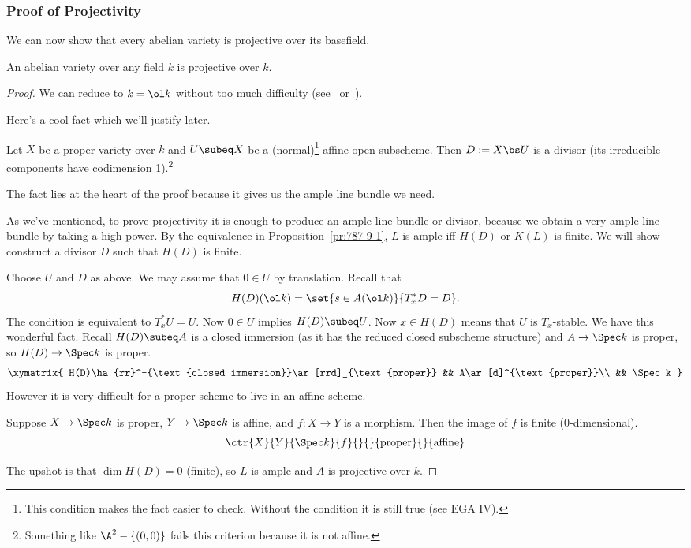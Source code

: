 \subsubsection{Proof of Projectivity}
We can now show that every abelian variety is projective over its basefield. 
\begin{thm}
An abelian variety over any field $k$ is projective over $k$.
\end{thm}
\begin{proof}
We can reduce to $k=\ol k$ without too much difficulty (see~\cite{MW71} or~\cite{GGBM}).

Here's a cool fact which we'll justify later.
\begin{fct}
Let $X$ be a proper variety over $k$ and $U\subeq X$ be a (normal)\footnote{This condition makes the fact easier to check. Without the condition it is still true (see EGA IV).} affine open subscheme. Then $D:=X\bs U$ is a divisor (its irreducible components have codimension 1).\footnote{Something like $\A^2-\{(0,0)\}$ fails this criterion because it is not affine.}
\end{fct}
The fact lies at the heart of the proof because it gives us the ample line bundle we need.

As we've mentioned, to prove projectivity it is enough to produce an ample line bundle or divisor, because we obtain a very ample line bundle by taking a high power. By the equivalence in Proposition~\ref{pr:787-9-1}, $L$ is ample iff $H(D)$ or $K(L)$ is finite. We will show construct a divisor $D$ such that $H(D)$ is finite. 

Choose $U$ and $D$ as above. We may assume that $0\in U$ by translation.
Recall that
\[
H(D)(\ol k)=\set{s\in A(\ol k)}{T_x^*D=D}.
\]
The condition is equivalent to $T_x^*U=U$. Now $0\in U$ implies $H(D)\subeq U$. 
Now $x\in H(D)$ means that $U$ is $T_x$-stable.  We have this wonderful fact. Recall $H(D)\subeq A$ is a closed immersion (as it has the reduced closed subscheme structure) %
and $A\to \Spec k$ is proper, so $H(D)\to \Spec k$ is proper.
\[
\xymatrix{
H(D)\ha{rr}^-{\text{closed immersion}}\ar[rrd]_{\text{proper}} && A\ar[d]^{\text{proper}}\\
&& \Spec k
}
\]
However it is very difficult for a proper scheme to live in an affine scheme.
\begin{fct}
Suppose $X\to \Spec k$ is proper, $Y\to \Spec k$ is affine, and $f:X\to Y$ is a morphism. Then the image of $f$ is finite (0-dimensional).
\[
\ctr{X}{Y}{\Spec k}{f}{}{}{\text{proper}}{}{\text{affine}}
\]
\end{fct}
The upshot is that $\dim H(D)=0$ (finite), so $L$ is ample and $A$ is projective over $k$.
\end{proof}

